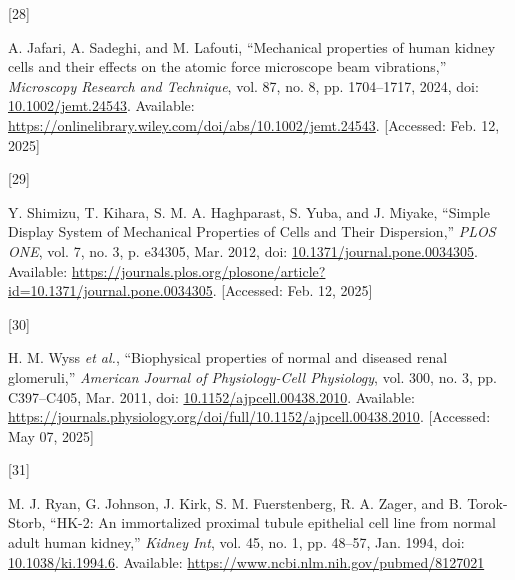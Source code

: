 \documentclass[
  paper=a4,
  ,captions=tableheading
]{scrartcl}
\newlength{\cslhangindent}
\newlength{\csllabelwidth}
\newenvironment{CSLReferences}[2] %
  {\begin{list}{}{%
   \setlength{\itemindent}{0pt}
   \setlength{\leftmargin}{0pt}
   \setlength{\parsep}{0pt}
   \ifodd #1
    \setlength{\leftmargin}{\cslhangindent}
    \setlength{\itemindent}{-1\cslhangindent}
   \fi
   \setlength{\itemsep}{#2\baselineskip}}}
  {\end{list}}
\newcommand{\CSLLeftMargin}[1]{\parbox[t]{\csllabelwidth}{\strut#1\strut}}
\newcommand{\CSLRightInline}[1]{\parbox[t]{\linewidth - \csllabelwidth}{\strut#1\strut}}
\begin{document}
\begin{CSLReferences}{0}{0}
\CSLLeftMargin{{[}28{]} }%
\CSLRightInline{A. Jafari, A. Sadeghi, and M. Lafouti, {``Mechanical
properties of human kidney cells and their effects on the atomic force
microscope beam vibrations,''} \emph{Microscopy Research and Technique},
vol. 87, no. 8, pp. 1704--1717, 2024, doi:
\href{https://doi.org/10.1002/jemt.24543}{10.1002/jemt.24543}.
Available:
\url{https://onlinelibrary.wiley.com/doi/abs/10.1002/jemt.24543}.
{[}Accessed: Feb. 12, 2025{]}}

\CSLLeftMargin{{[}29{]} }%
\CSLRightInline{Y. Shimizu, T. Kihara, S. M. A. Haghparast, S. Yuba, and
J. Miyake, {``Simple {Display System} of {Mechanical Properties} of
{Cells} and {Their Dispersion},''} \emph{PLOS ONE}, vol. 7, no. 3, p.
e34305, Mar. 2012, doi:
\href{https://doi.org/10.1371/journal.pone.0034305}{10.1371/journal.pone.0034305}.
Available:
\url{https://journals.plos.org/plosone/article?id=10.1371/journal.pone.0034305}.
{[}Accessed: Feb. 12, 2025{]}}

\CSLLeftMargin{{[}30{]} }%
\CSLRightInline{H. M. Wyss \emph{et al.}, {``Biophysical properties of
normal and diseased renal glomeruli,''} \emph{American Journal of
Physiology-Cell Physiology}, vol. 300, no. 3, pp. C397--C405, Mar. 2011,
doi:
\href{https://doi.org/10.1152/ajpcell.00438.2010}{10.1152/ajpcell.00438.2010}.
Available:
\url{https://journals.physiology.org/doi/full/10.1152/ajpcell.00438.2010}.
{[}Accessed: May 07, 2025{]}}

\CSLLeftMargin{{[}31{]} }%
\CSLRightInline{M. J. Ryan, G. Johnson, J. Kirk, S. M. Fuerstenberg, R.
A. Zager, and B. Torok-Storb, {``{HK-2}: An immortalized proximal tubule
epithelial cell line from normal adult human kidney,''} \emph{Kidney
Int}, vol. 45, no. 1, pp. 48--57, Jan. 1994, doi:
\href{https://doi.org/10.1038/ki.1994.6}{10.1038/ki.1994.6}. Available:
\url{https://www.ncbi.nlm.nih.gov/pubmed/8127021}}

\end{CSLReferences}
\end{document}
